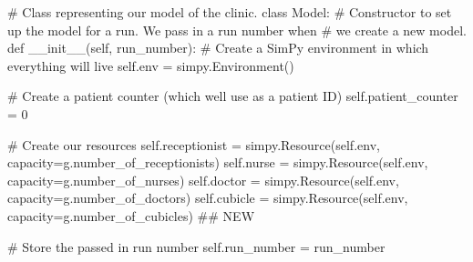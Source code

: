 \documentclass[
  letterpaper,
  DIV=11,
  numbers=noendperiod]{scrreprt}
\newenvironment{Shaded}{}{}
\newcommand{\CommentTok}[1]{\textcolor[rgb]{0.42,0.45,0.49}{#1}}
\newcommand{\DecValTok}[1]{\textcolor[rgb]{0.00,0.36,0.77}{#1}}
\newcommand{\FunctionTok}[1]{\textcolor[rgb]{0.44,0.26,0.76}{#1}}
\newcommand{\KeywordTok}[1]{\textcolor[rgb]{0.84,0.23,0.29}{#1}}
\newcommand{\NormalTok}[1]{\textcolor[rgb]{0.14,0.16,0.18}{#1}}
\newcommand{\OperatorTok}[1]{\textcolor[rgb]{0.14,0.16,0.18}{#1}}
\newcommand{\VariableTok}[1]{\textcolor[rgb]{0.89,0.38,0.04}{#1}}
\begin{document}
\begin{tcolorbox}
\begin{Shaded}
\begin{Highlighting}[]
\CommentTok{\# Class representing our model of the clinic.}
\KeywordTok{class}\NormalTok{ Model:}
    \CommentTok{\# Constructor to set up the model for a run.  We pass in a run number when}
    \CommentTok{\# we create a new model.}
    \KeywordTok{def} \FunctionTok{\_\_init\_\_}\NormalTok{(}\VariableTok{self}\NormalTok{, run\_number):}
        \CommentTok{\# Create a SimPy environment in which everything will live}
        \VariableTok{self}\NormalTok{.env }\OperatorTok{=}\NormalTok{ simpy.Environment()}

        \CommentTok{\# Create a patient counter (which we\textquotesingle{}ll use as a patient ID)}
        \VariableTok{self}\NormalTok{.patient\_counter }\OperatorTok{=} \DecValTok{0}

        \CommentTok{\# Create our resources}
        \VariableTok{self}\NormalTok{.receptionist }\OperatorTok{=}\NormalTok{ simpy.Resource(}\VariableTok{self}\NormalTok{.env, capacity}\OperatorTok{=}\NormalTok{g.number\_of\_receptionists)}
        \VariableTok{self}\NormalTok{.nurse }\OperatorTok{=}\NormalTok{ simpy.Resource(}\VariableTok{self}\NormalTok{.env, capacity}\OperatorTok{=}\NormalTok{g.number\_of\_nurses)}
        \VariableTok{self}\NormalTok{.doctor }\OperatorTok{=}\NormalTok{ simpy.Resource(}\VariableTok{self}\NormalTok{.env, capacity}\OperatorTok{=}\NormalTok{g.number\_of\_doctors)}
        \VariableTok{self}\NormalTok{.cubicle }\OperatorTok{=}\NormalTok{ simpy.Resource(}\VariableTok{self}\NormalTok{.env, capacity}\OperatorTok{=}\NormalTok{g.number\_of\_cubicles) }\CommentTok{\#\# NEW}

        \CommentTok{\# Store the passed in run number}
        \VariableTok{self}\NormalTok{.run\_number }\OperatorTok{=}\NormalTok{ run\_number}


\end{Highlighting}
\end{Shaded}
\end{tcolorbox}
\end{document}
